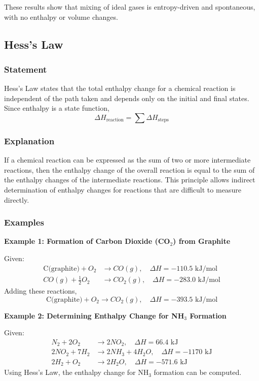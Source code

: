 \documentclass{article}
\theoremstyle{definition}
\begin{document}
These results show that mixing of ideal gases is entropy-driven and spontaneous, with no enthalpy or volume changes.

\subsection{Hess's Law}

\subsubsection{Statement}
Hess's Law states that the total enthalpy change for a chemical reaction is independent of the path taken and depends only on the initial and final states. Since enthalpy is a state function,
\begin{equation}
\Delta H_{\text{reaction}} = \sum \Delta H_{\text{steps}}
\end{equation}

\subsubsection{Explanation}
If a chemical reaction can be expressed as the sum of two or more intermediate reactions, then the enthalpy change of the overall reaction is equal to the sum of the enthalpy changes of the intermediate reactions. This principle allows indirect determination of enthalpy changes for reactions that are difficult to measure directly.

\subsubsection{Examples}
\textbf{Example 1: Formation of Carbon Dioxide (CO$_2$) from Graphite}

Given:
\begin{align*}
\text{C(graphite)} + O_2 &\rightarrow CO(g), \quad \Delta H = -110.5 \text{ kJ/mol}\\
CO(g) + \frac{1}{2} O_2 &\rightarrow CO_2(g), \quad \Delta H = -283.0 \text{ kJ/mol}
\end{align*}
Adding these reactions,
\begin{equation}
\text{C(graphite)} + O_2 \rightarrow CO_2(g), \quad \Delta H = -393.5 \text{ kJ/mol}
\end{equation}

\textbf{Example 2: Determining Enthalpy Change for NH$_3$ Formation}

Given:
\begin{align*}
N_2 + 2O_2 &\rightarrow 2NO_2, \quad \Delta H = 66.4 \text{ kJ}\\
2NO_2 + 7H_2 &\rightarrow 2NH_3 + 4H_2O, \quad \Delta H = -1170 \text{ kJ}\\
2H_2 + O_2 &\rightarrow 2H_2O, \quad \Delta H = -571.6 \text{ kJ}
\end{align*}
Using Hess’s Law, the enthalpy change for NH$_3$ formation can be computed.
\end{document}
